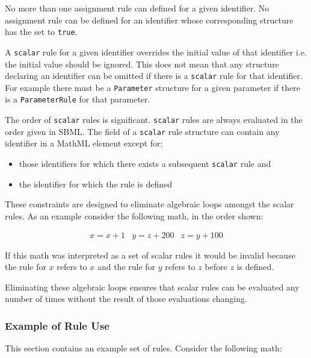 \documentclass[10pt]{cekarticle}
\begin{document}
No more than one assignment rule can defined for a given
identifier.  No assignment rule can be defined for an identifier
whose corresponding structure has the  set to
\texttt{true}.

A \texttt{scalar} rule for a given identifier overrides the
initial value of that identifier i.e. the initial value should be
ignored. This does not mean that any structure declaring an
identifier can be omitted if there is a \texttt{scalar} rule for
that identifier.  For example there must be a \texttt{Parameter}
structure for a given parameter if there is a
\texttt{ParameterRule} for that parameter.

The order of \texttt{scalar} rules is significant. \texttt{scalar}
rules are always evaluated in the order given in SBML.  The
 field of a \texttt{scalar} rule structure can
contain any identifier in a MathML  element except for:
\begin{itemize}

\item those identifiers for which there exists a subsequent
\texttt{scalar} rule and

\item the identifier for which the rule is defined

\end{itemize}
These constraints are designed to eliminate algebraic loops
amongst the scalar rules.  As an example consider the following math, in the order shown:

\begin{equation*}
  \begin{array}{lll}
    x = x + 1 & y = z + 200 & z = y + 100\\ \\[-4pt]
  \end{array}
\end{equation*}
If this math was interpreted as a set of scalar rules it would be invalid because the rule for $x$ refers to $x$ and the rule for $y$ refers to $z$ before $z$ is defined.

Eliminating these algebraic loops ensures that scalar rules can be evaluated any number of times without the result of those evaluations changing.

\subsubsection{Example of Rule Use}

This section contains an example set of rules.  Consider the 
following math:
\end{document}
